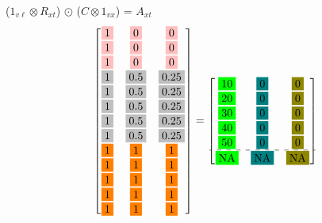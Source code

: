 \documentclass[english]{beamer}
\begin{document}
\begin{frame}{(\(1_{v\ell} \otimes R_{xt}\)) \(\odot\) (\(C \otimes 1_{vx}\)) = $A_{xt}$}
\[\begin{bmatrix}
\fcolorbox{white}{pink}{1} & \fcolorbox{white}{pink}{0} & \fcolorbox{white}{pink}{0} \\
\fcolorbox{white}{pink}{1} & \fcolorbox{white}{pink}{0} & \fcolorbox{white}{pink}{0} \\
\fcolorbox{white}{pink}{1} & \fcolorbox{white}{pink}{0} & \fcolorbox{white}{pink}{0} \\
\fcolorbox{white}{lightgray}{1} & \fcolorbox{white}{lightgray}{0.5} & \fcolorbox{white}{lightgray}{0.25} \\
\fcolorbox{white}{lightgray}{1} & \fcolorbox{white}{lightgray}{0.5} & \fcolorbox{white}{lightgray}{0.25} \\
\fcolorbox{white}{lightgray}{1} & \fcolorbox{white}{lightgray}{0.5} & \fcolorbox{white}{lightgray}{0.25} \\
\fcolorbox{white}{lightgray}{1} & \fcolorbox{white}{lightgray}{0.5} & \fcolorbox{white}{lightgray}{0.25} \\
\fcolorbox{white}{lightgray}{1} & \fcolorbox{white}{lightgray}{0.5} & \fcolorbox{white}{lightgray}{0.25} \\
\fcolorbox{white}{orange}{1} & \fcolorbox{white}{orange}{1} & \fcolorbox{white}{orange}{1} \\
\fcolorbox{white}{orange}{1} & \fcolorbox{white}{orange}{1} & \fcolorbox{white}{orange}{1} \\
\fcolorbox{white}{orange}{1} & \fcolorbox{white}{orange}{1} & \fcolorbox{white}{orange}{1} \\
\fcolorbox{white}{orange}{1} & \fcolorbox{white}{orange}{1} & \fcolorbox{white}{orange}{1} \\
\fcolorbox{white}{orange}{1} & \fcolorbox{white}{orange}{1} & \fcolorbox{white}{orange}{1}
\end{bmatrix} = \begin{bmatrix}
\fcolorbox{white}{green}{10} & \fcolorbox{white}{teal}{0} & \fcolorbox{white}{olive}{0} \\
\fcolorbox{white}{green}{20} & \fcolorbox{white}{teal}{0} & \fcolorbox{white}{olive}{0} \\
\fcolorbox{white}{green}{30} & \fcolorbox{white}{teal}{0} & \fcolorbox{white}{olive}{0} \\
\fcolorbox{white}{green}{40} & \fcolorbox{white}{teal}{0} & \fcolorbox{white}{olive}{0} \\ 
\fcolorbox{white}{green}{50} & \fcolorbox{white}{teal}{0} & \fcolorbox{white}{olive}{0} \\ \hdashline
\fcolorbox{white}{green}{NA} & \fcolorbox{white}{teal}{NA} & \fcolorbox{white}{olive}{NA} \\ 

\end{bmatrix}\]
\end{frame}
\end{document}
